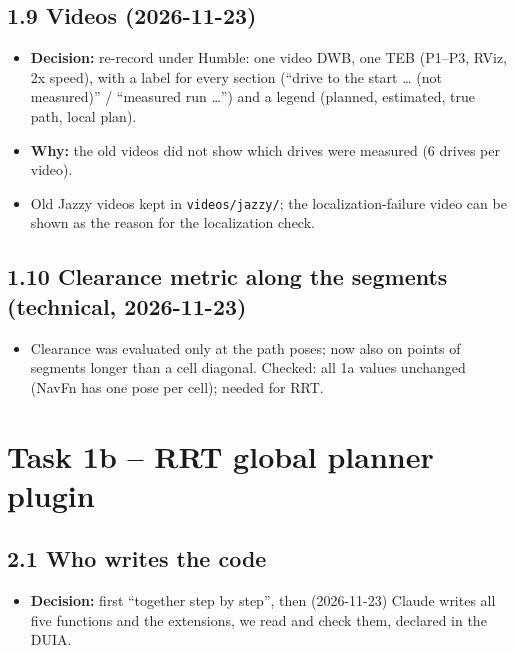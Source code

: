 \documentclass[10pt]{article}
\newcommand{\pkg}[1]{\texttt{#1}}
\begin{document}
\subsection*{1.9 Videos (2026-11-23)}
\begin{itemize}
  \item \textbf{Decision:} re-record under Humble: one video DWB, one TEB (P1--P3, RViz, 2x speed), with a label for every section (``drive to the start \ldots{} (not measured)'' / ``measured run \ldots{}'') and a legend (planned, estimated, true path, local plan).
  \item \textbf{Why:} the old videos did not show which drives were measured (6 drives per video).
  \item Old Jazzy videos kept in \pkg{videos/jazzy/}; the localization-failure video can be shown as the reason for the localization check.
\end{itemize}

\subsection*{1.10 Clearance metric along the segments (technical, 2026-11-23)}
\begin{itemize}
  \item Clearance was evaluated only at the path poses; now also on points of segments longer than a cell diagonal. Checked: all 1a values unchanged (NavFn has one pose per cell); needed for RRT.
\end{itemize}

\section{Task 1b -- RRT global planner plugin}

\subsection*{2.1 Who writes the code}
\begin{itemize}
  \item \textbf{Decision:} first ``together step by step'', then (2026-11-23) Claude writes all five functions and the extensions, we read and check them, declared in the DUIA.
\end{itemize}
\end{document}
